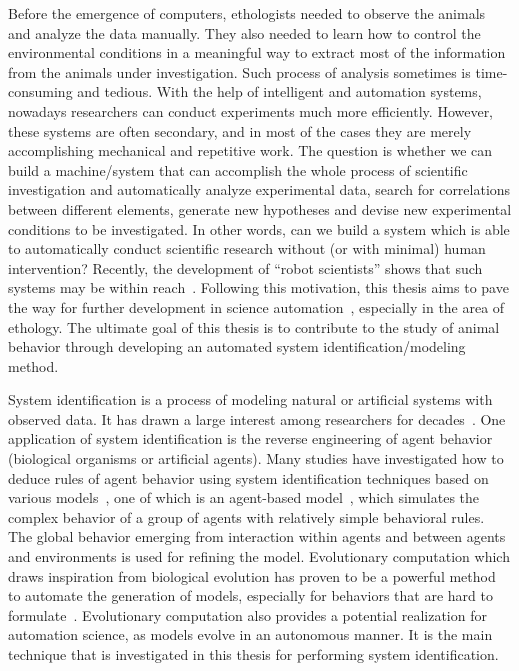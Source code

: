 Before the emergence of computers, ethologists needed to observe the animals and analyze the data manually. They also needed to learn how to control the environmental conditions in a meaningful way to extract most of the information from the animals under investigation. Such process of analysis sometimes is time-consuming and tedious. With the help of intelligent and automation systems, nowadays researchers can conduct experiments much more efficiently. However, these systems are often secondary, and in most of the cases they are merely accomplishing mechanical and repetitive work. The question is whether we can build a machine/system that can accomplish the whole process of scientific investigation and automatically analyze experimental data, search for correlations between different elements, generate new hypotheses and devise new experimental conditions to be investigated. In other words, can we build a system which is able to automatically conduct scientific research without (or with minimal) human intervention? Recently, the development of ``robot scientists'' shows that such systems may be within reach~\cite{King_2009, Evans_2010, Waltz2010}. Following this motivation, this thesis aims to pave the way for further development in science automation~\cite{Evans_2010}, especially in the area of ethology. The ultimate goal of this thesis is to contribute to the study of animal behavior through developing an automated system identification/modeling method.

System identification is a process of modeling natural or artificial systems with observed data. It has drawn a large interest among researchers for decades~\cite{Ljung2010, Billings2013}. One application of system identification is the reverse engineering of agent behavior (biological organisms or artificial agents). Many studies have investigated how to deduce rules of agent behavior using system identification techniques based on various models~\cite{Shandelle2010}, one of which is an agent-based model~\cite{Bonabeau2002}, which simulates the complex behavior of a group of agents with relatively simple behavioral rules. The global behavior emerging from interaction within agents and between agents and environments is used for refining the model. Evolutionary computation which draws inspiration from biological evolution has proven to be a powerful method to automate the generation of models, especially for behaviors that are hard to formulate~\cite{Bongard2005_tevc, Bongard2007PNAS, Ruxton2008}. Evolutionary computation also provides a potential realization for automation science, as models evolve in an autonomous manner. It is the main technique that is investigated in this thesis for performing system identification.

